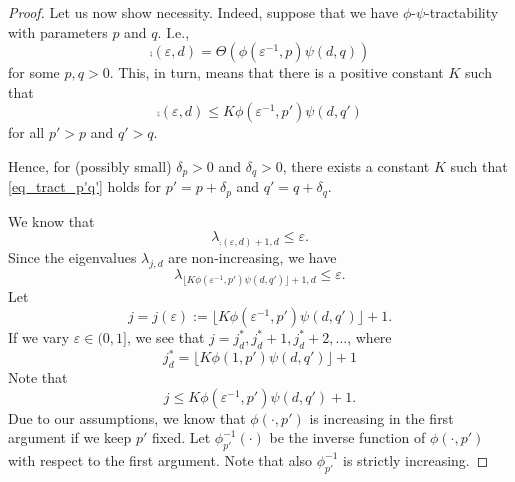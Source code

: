 \documentclass[11pt,a4paper]{article}
\begin{document}
\begin{proof}
Let us now show necessity. Indeed, suppose that we have 
$\phi$-$\psi$-tractability with parameters $p$ and $q$. I.e., 
\[
\comp(\varepsilon,d)=\Theta (\phi(\varepsilon^{-1},p)\psi(d,q))
\]
for some $p,q>0$. This, in turn, means that there is a positive constant $K$ such that
\begin{equation}\label{eq_tract_p'q'}
\comp(\varepsilon,d)\le K \phi(\varepsilon^{-1},p')\psi(d,q')
\end{equation}
for all $p'>p$ and $q'>q$. 

Hence, for (possibly small) $\delta_p>0$ and $\delta_q>0$, there exists a constant $K$ such that \eqref{eq_tract_p'q'} holds for $p'=p+\delta_p$ 
and $q'=q+\delta_q$.

We know that
\[
\lambda_{\comp(\varepsilon,d)+1,d}\le \varepsilon.
\]
Since the eigenvalues $\lambda_{j,d}$ are non-increasing, we have
\begin{equation}\label{eq:lambda_K}
\lambda_{\lfloor K \phi(\varepsilon^{-1},p')\psi(d,q')\rfloor +1,d}\le \varepsilon.
\end{equation}
Let
\[
j=j (\varepsilon):= \lfloor K \phi(\varepsilon^{-1},p')\psi(d,q')\rfloor +1.
\]
If we vary $\varepsilon\in (0,1]$, we see that $j=j_d^*, j_d^*+1, j_d^*+2,\ldots$, where 
\[
  j_d^*=\lfloor K \phi(1,p')\psi(d,q')\rfloor +1
\]
Note that
\[
j\le K \phi(\varepsilon^{-1},p')\psi(d,q') +1.
\]
Due to our assumptions, we know that 
$\phi(\cdot, p')$ is increasing in the first argument if 
we keep $p'$ fixed. Let $\phi_{p'}^{-1} (\cdot)$ be the inverse function of $\phi (\cdot, p')$ with respect to the first argument. Note that also $\phi_{p'}^{-1}$ is strictly increasing. 


\end{proof}
\end{document}
